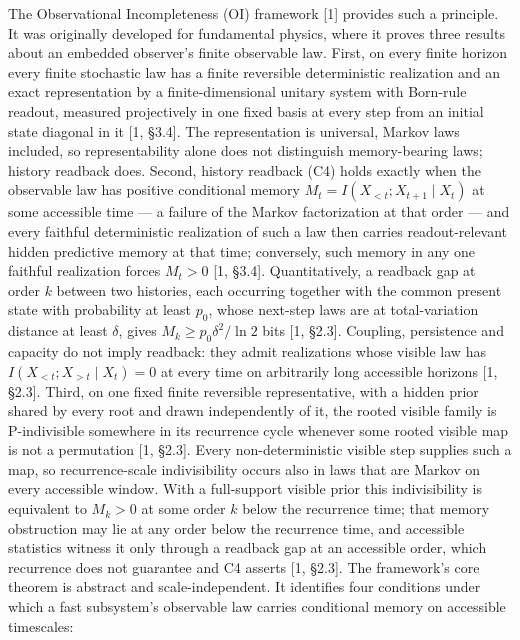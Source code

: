 \documentclass[
]{article}
\begin{document}
The Observational Incompleteness (OI) framework {[}1{]} provides such a
principle. It was originally developed for fundamental physics, where it
proves three results about an embedded observer's finite observable law.
First, on every finite horizon every finite stochastic law has a finite
reversible deterministic realization and an exact representation by a
finite-dimensional unitary system with Born-rule readout, measured
projectively in one fixed basis at every step from an initial state
diagonal in it {[}1, §3.4{]}. The representation is universal, Markov
laws included, so representability alone does not distinguish
memory-bearing laws; history readback does. Second, history readback
(C4) holds exactly when the observable law has positive conditional
memory \(M_t = I(X_{<t}; X_{t+1} \mid X_t)\) at some accessible time ---
a failure of the Markov factorization at that order --- and every
faithful deterministic realization of such a law then carries
readout-relevant hidden predictive memory at that time; conversely, such
memory in any one faithful realization forces \(M_t > 0\) {[}1, §3.4{]}.
Quantitatively, a readback gap at order \(k\) between two histories,
each occurring together with the common present state with probability
at least \(p_0\), whose next-step laws are at total-variation distance
at least \(\delta\), gives \(M_k \geq p_0\delta^2/\ln 2\) bits {[}1,
§2.3{]}. Coupling, persistence and capacity do not imply readback: they
admit realizations whose visible law has
\(I(X_{<t}; X_{>t} \mid X_t) = 0\) at every time on arbitrarily long
accessible horizons {[}1, §2.3{]}. Third, on one fixed finite reversible
representative, with a hidden prior shared by every root and drawn
independently of it, the rooted visible family is P-indivisible
somewhere in its recurrence cycle whenever some rooted visible map is
not a permutation {[}1, §2.3{]}. Every non-deterministic visible step
supplies such a map, so recurrence-scale indivisibility occurs also in
laws that are Markov on every accessible window. With a full-support
visible prior this indivisibility is equivalent to \(M_k > 0\) at some
order \(k\) below the recurrence time; that memory obstruction may lie
at any order below the recurrence time, and accessible statistics
witness it only through a readback gap at an accessible order, which
recurrence does not guarantee and C4 asserts {[}1, §2.3{]}. The
framework's core theorem is abstract and scale-independent. It
identifies four conditions under which a fast subsystem's observable law
carries conditional memory on accessible timescales:
\end{document}
